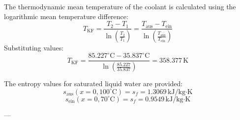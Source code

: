 The thermodynamic mean temperature of the coolant is calculated using the logarithmic mean temperature difference:  
\[
T_{\text{KF}} = \frac{T_2 - T_1}{\ln\left(\frac{T_2}{T_1}\right)} = \frac{T_{\text{aus}} - T_{\text{ein}}}{\ln\left(\frac{T_{\text{aus}}}{T_{\text{ein}}}\right)}
\]  
Substituting values:  
\[
T_{\text{KF}} = \frac{85.227^\circ\text{C} - 35.837^\circ\text{C}}{\ln\left(\frac{85.227}{35.837}\right)} = 358.377 \, \text{K}
\]  

The entropy values for saturated liquid water are provided:  
\[
s_{\text{aus}} (x = 0, 100^\circ\text{C}) = s_f = 1.3069 \, \text{kJ/kg·K}
\]  
\[
s_{\text{ein}} (x = 0, 70^\circ\text{C}) = s_f = 0.9549 \, \text{kJ/kg·K}
\]  

---